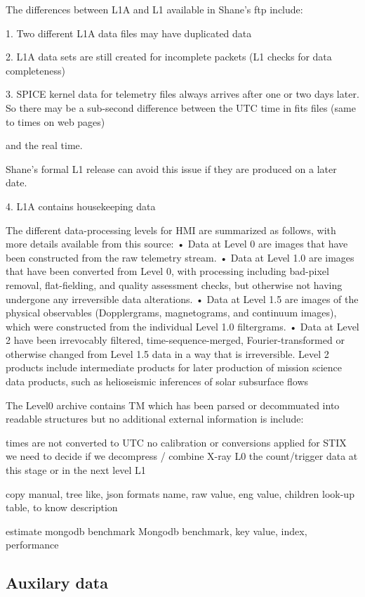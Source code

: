 \documentclass{aa}
\begin{document}
The differences between L1A and L1 available in Shane's ftp include:

1.  Two different L1A data files may have duplicated data

2.  L1A data sets are still created for incomplete packets  (L1 checks for data completeness)

3.  SPICE kernel data for telemetry files always arrives  after one or two days later.
    So  there may be a sub-second difference between the UTC time in fits files (same to times on web pages)

   and the real time.

    Shane's formal L1 release can avoid this issue if they are produced on a later date.

4. L1A contains housekeeping data

The different data-processing levels for HMI are summarized as follows, with more details available from this source:
• Data at Level 0 are images that have been constructed from the raw telemetry stream.
• Data at Level 1.0 are images that have been converted from Level 0, with processing including bad-pixel removal, flat-fielding,
and quality assessment checks, but otherwise not having undergone any irreversible data alterations.
• Data at Level 1.5 are images of the physical observables (Dopplergrams, magnetograms, and continuum images), which were
constructed from the individual Level 1.0 filtergrams.
• Data at Level 2 have been irrevocably filtered, time-sequence-merged, Fourier-transformed or otherwise changed from Level 1.5
data in a way that is irreversible. Level 2 products include intermediate products for later production of mission science data
products, such as helioseismic inferences of solar subsurface flows


The Level0 archive contains TM which has been parsed or decommuated into readable structures but no additional external information is include:

times are not converted to UTC
no calibration or conversions applied
for STIX we need to decide if we decompress / combine X-ray L0 the count/trigger data at this stage or in the next level L1

copy manual,
tree like, 
json formats
name, raw value, eng value, children
look-up table, to know description

estimate mongodb benchmark
Mongodb benchmark,
key value, index, performance


\subsection{Auxilary data}
\end{document}
